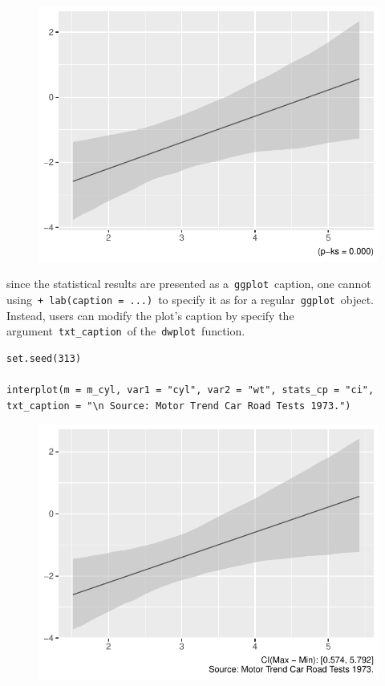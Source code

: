 \documentclass[
  article]{jss}
\begin{document}
\begin{figure}[H]

{\centering \includegraphics{jss_manuscript_files/figure-pdf/unnamed-chunk-15-1.pdf}

}

\end{figure}

since the statistical results are presented as
a~\texttt{ggplot}~caption, one cannot
using~\texttt{+\ lab(caption\ =\ ...)}~to specify it as for a
regular~\texttt{ggplot}~object. Instead, users can modify the plot's
caption by specify the argument~\texttt{txt\_caption}~of
the~\texttt{dwplot}~function.

\begin{verbatim}
set.seed(313)

interplot(m = m_cyl, var1 = "cyl", var2 = "wt", stats_cp = "ci", txt_caption = "\n Source: Motor Trend Car Road Tests 1973.")
\end{verbatim}

\begin{figure}[H]

{\centering \includegraphics{jss_manuscript_files/figure-pdf/unnamed-chunk-16-1.pdf}

}

\end{figure}
\end{document}
